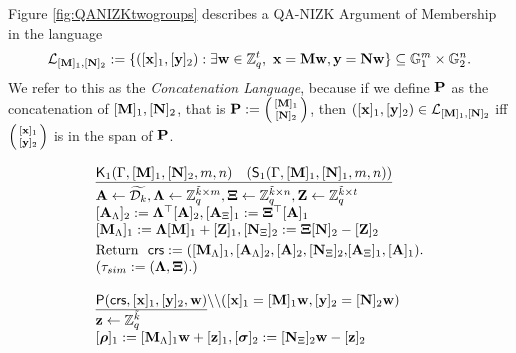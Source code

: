 Figure \ref{fig:QANIZKtwogroups} describes a QA-NIZK Argument of Membership in the language 
$$\mathcal{L}_{[\matr{M}]_1,[\matr{N}]_2}:=\{ ([\vecb{x}]_1,[\vecb{y}]_2): \exists \vecb{w} \in \Z_q^{t}, \ \vecb{x}=\matr{M}\vecb{w},   \vecb{y}=\matr{N}\vecb{w} \} \subseteq \GG_1^{m} \times \GG_2^{n}.$$
We refer to this as the \textit{Concatenation Language}, because 
if we define $\matr{P}$ as the concatenation of $[\matr{M}]_1,[\matr{N}]_2$, that is $\matr{P}:=\smallpmatrix{[\matr{M}]_1 \\ [\matr{N}]_2}$, then  $([\vecb{x}]_1,[\vecb{y}]_2) \in \mathcal{L}_{[\matr{M}]_1,[\matr{N}]_2}$ iff $\smallpmatrix{[\vecb{x}]_1 \\ [\vecb{y}]_2}$ is in the span of $\matr{P}$.
\begin{figure}
$$
\begin{array}{l}
\begin{array}{l}
    \underline{\algK_1(\Gamma,[\matr{M}]_1,[\matr{N}]_2,m,n) \quad  (\mathsf{S}_1(\Gamma,[\matr{M}]_1,[\matr{N}]_1,m,n))}\\[.1cm]
    \matr{A} \gets \widetilde{\dist_{k}},\matr{\Lambda} \gets \Z_q^{\tilde{k} \times m}, \matr{\Xi}\gets \Z_q^{\tilde{k}\times n}, \matr{Z} \gets \Z_q^{\tilde{k} \times t}\\
    {[\matr{A}_{\Lambda}]_2:= \matr{\Lambda}^\top [\matr{A}]_2},{[\matr{A}_{\Xi}]_1:= \matr{\Xi}^\top[\matr{A}]_1}\\
    {[\matr{M}_{\Lambda}]_1:=\matr{\Lambda} [\matr{M}]_1+[\matr{Z}]_1},{[\matr{N}_{\Xi}]_2:=\matr{\Xi} [\matr{N}]_2-[\matr{Z}]_2} \\ [.1cm]
    {\text{Return } \ \mathsf{crs}:=([\matr{M}_{\Lambda}]_1, [\matr{A}_\Lambda]_2 , [\matr{A}]_2,[\matr{N}_{\Xi}]_2,}{[\matr{A}_{\Xi}]_1 , [\matr{A}]_1).}\\
    (\tau_{sim}:=(\matr{\Lambda},\matr{\Xi}).)
    \\
    \\    
\end{array}
\\
\begin{array}{l}
    \underline{\algP(\mathsf{crs}, [\vecb{x}]_1, [\vecb{y}]_2, \vecb{w})}\backslash \backslash ([\vecb{x}]_1=[\matr{M}]_1 \vecb{w}, [\vecb{y}]_2=[\matr{N}]_2 \vecb{w})
    \\
    \matr{z} \gets \Z_q^{\tilde{k}}\\
    {[\grkb{\rho}]_1:=[\matr{M}_{\Lambda}]_1 \vecb{w}+ [\vecb{z}]_1},{[\grkb{\sigma}]_2:=[\matr{N}_{\Xi}]_2 \vecb{w}- [\vecb{z}]_2}\\

\end{array}
\end{array}$$
\end{figure}
